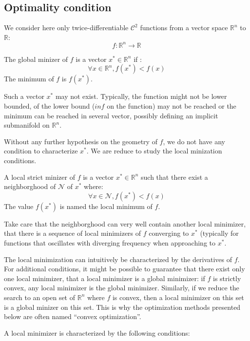 \documentclass{book}
\begin{document}
\subsection{Optimality condition}

We consider here only twice-differentiable $\mathcal{C}^2$ functions from a vector space $\mathbb{R}^n$ to $\mathbb{R}$:
\[ f: \mathbb{R}^n \rightarrow \mathbb{R} \]

\begin{definition}
The global minizer of $f$ is a vector $x^*\in\mathbb{R}^n$ if :
\[ \forall x \in \mathbb{R}^n, f(x^*) < f(x) \]
The minimum of $f$ is $f(x^*)$.
\end{definition}

Such a vector $x^*$ may not exist. Typically, the function might not be lower bounded, of the lower bound ($inf$ on the function) may not be reached or the minimum can be reached in several vector, possibly defining an implicit submanifold on $\mathbb{R}^n$.

Without any further hypothesis on the geometry of $f$, we do not have any condition to characterize $x^*$. We are reduce to study the local minization conditions.

\begin{definition}
A local strict minizer of $f$ is a vector $x^*\in\mathbb{R}^n$ such that there exist a neighborghood of $\mathcal{N}$ of $x^*$ where:
\[ \forall x \in \mathcal{N}, f(x^*) < f(x) \]
The value $f(x^*)$ is named the local minimum of $f$.
\end{definition}

Take care that the neighborghood can very well contain another local minimizer, \mie that there is a sequence of local minimizers of $f$ converging to $x^*$ (typically for functions that oscillates with diverging frequency when approaching to $x^*$.

The local minimization can intuitively be characterized by the derivatives of $f$. For additional conditions, it might be possible to guarantee that there exist only one local minimizer, \mie that a local minimizer is a global minimizer: if $f$ is strictly convex, any local minimizer is the global minimizer. Similarly, if we reduce the search to an open set of $\mathbb{R}^n$ where $f$ is convex, then a local minimizer on this set is a global minizer on this set. This is why the optimization methods presented below are often named ``convex optimization''.

A local minimizer is characterized by the following conditions:
\end{document}
